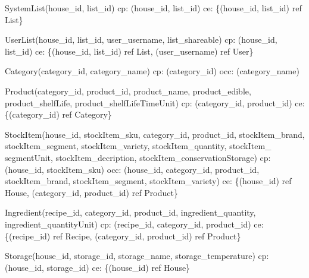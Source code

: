 {\begin{description}
		\item SystemList(house\_id, list\_id)
		\newline
		\acrshort{cp}: (house\_id, list\_id) \newline
		\acrshort{ce}: \{(house\_id, list\_id) ref List\}
		
		\item UserList(house\_id, list\_id, user\_username, list\_shareable)
		\newline
		\acrshort{cp}: (house\_id, list\_id) \newline
		\acrshort{ce}: \{(house\_id, list\_id) ref List, (user\_username) ref User\}
		
		\item Category(category\_id, category\_name)
		\newline
		\acrshort{cp}: (category\_id) \newline
		\acrshort{occ}: (category\_name)
		
		\item Product(category\_id, product\_id, product\_name, product\_edible, product\_shelfLife, \newline product\_shelfLifeTimeUnit) \newline
		\acrshort{cp}: (category\_id, product\_id) \newline
		\acrshort{ce}: \{(category\_id) ref Category\}
		
		\item StockItem(house\_id, stockItem\_sku, category\_id, product\_id, stockItem\_brand, stockItem\_segment, stockItem\_variety, stockItem\_quantity, stockItem\_ segmentUnit, stockItem\_decription, stockItem\_conservationStorage) \newline
		\acrshort{cp}: (house\_id, stockItem\_sku) \newline
		\acrshort{occ}: (house\_id, category\_id, product\_id, stockItem\_brand, stockItem\_segment, stockItem\_variety) \newline
		\acrshort{ce}: \{(house\_id) ref House, (category\_id, product\_id) ref Product\}
		
		\item Ingredient(recipe\_id, category\_id, product\_id, ingredient\_quantity, ingredient\_quantityUnit) \newline
		\acrshort{cp}: (recipe\_id, category\_id, product\_id) \newline
		\acrshort{ce}: \{(recipe\_id) ref Recipe, (category\_id, product\_id) ref Product\}
		
		\item Storage(house\_id, storage\_id, storage\_name, storage\_temperature)  \newline
		\acrshort{cp}:(house\_id, storage\_id) \newline
		\acrshort{ce}: \{(house\_id) ref House\}
	

\end{description}}
